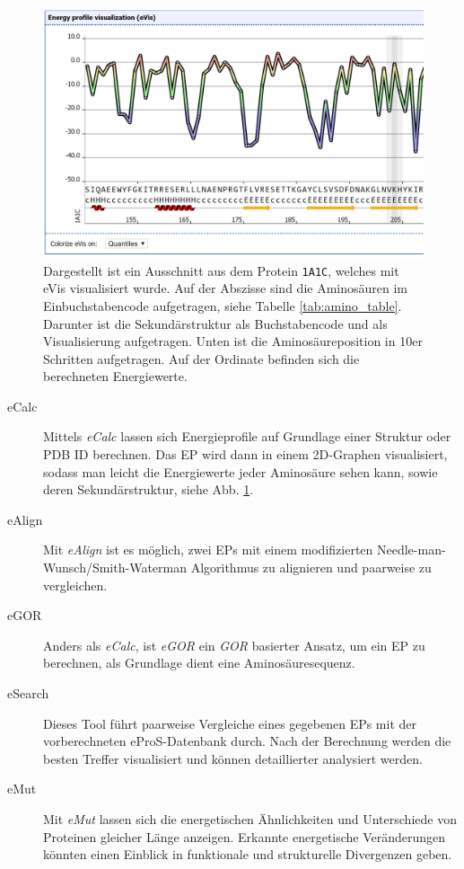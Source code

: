 \begin{figure}
    \includegraphics[width=.95\textwidth]{images/ePros.png}
    \caption{Dargestellt ist ein Ausschnitt aus dem Protein \texttt{1A1C}, welches mit \ac{eVis} visualisiert wurde. Auf der Abszisse sind die Aminosäuren im Einbuchstabencode aufgetragen, siehe Tabelle \ref{tab:amino_table}. Darunter ist die Sekundärstruktur als Buchstabencode und als Visualisierung aufgetragen. Unten ist die Aminosäureposition in 10er Schritten aufgetragen. Auf der Ordinate befinden sich die berechneten Energiewerte.}
    \label{fig:epros}
\end{figure}

\begin{description}
    \item[eCalc]
    Mittels \emph{eCalc} lassen sich Energieprofile auf Grundlage einer Struktur oder \ac{PDB} ID berechnen. Das EP wird dann in einem 2D-Graphen visualisiert, sodass man leicht die Energiewerte jeder Aminosäure sehen kann, sowie deren Sekundärstruktur, siehe Abb. \ref{fig:epros}.
    \item[eAlign]
    Mit \emph{eAlign} ist es möglich, zwei EPs mit einem modifizierten Needle-man-Wunsch/Smith-Waterman Algorithmus zu alignieren und paarweise zu vergleichen.
    \item[eGOR]
    Anders als \emph{eCalc}, ist \emph{eGOR} ein \emph{GOR} \cite{Garnier.1996} basierter Ansatz, um ein EP zu berechnen, als Grundlage dient eine Aminosäuresequenz.
    \item[eSearch]
    Dieses Tool führt paarweise Vergleiche eines gegebenen EPs mit der vorberechneten eProS-Datenbank durch. Nach der Berechnung werden die besten Treffer visualisiert und können detaillierter analysiert werden.
    \item[eMut]
    Mit \emph{eMut} lassen sich die energetischen Ähnlichkeiten und Unterschiede von Proteinen gleicher Länge anzeigen. Erkannte energetische Veränderungen könnten einen Einblick in funktionale und strukturelle Divergenzen geben.
\end{description}


